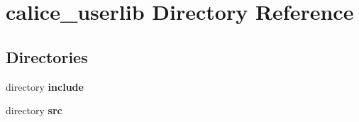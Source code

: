 \section{calice\-\_\-userlib Directory Reference}
\label{dir_abf3346b1fee8f5634d2883e95cc08b2}
\subsection*{Directories}
\begin{DoxyCompactItemize}
\item 
directory {\bf include}
\item 
directory {\bf src}
\end{DoxyCompactItemize}
